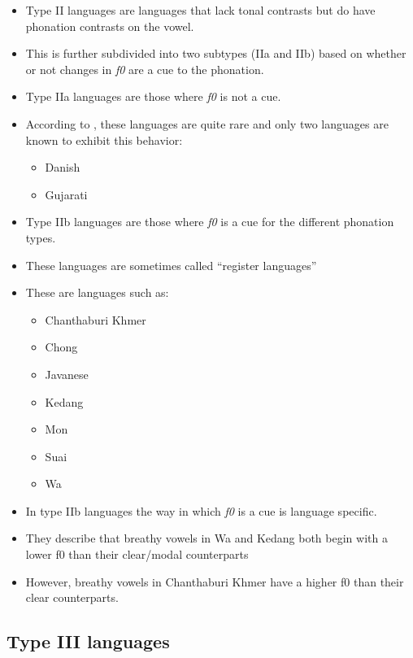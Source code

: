\begin{itemize}
    \item Type II languages are languages that lack tonal contrasts but do have phonation contrasts on the vowel. 
    \item This is further subdivided into two subtypes (IIa and IIb) based on whether or not changes in \textit{f0} are a cue to the phonation. 
    \item Type IIa languages are those where \textit{f0} is not a cue. 
    \item According to \citet{espositoCrosslinguisticPatternsPhonation2020}, these languages are quite rare and only two languages are known to exhibit this behavior: 
    \begin{itemize}
        \item Danish \citep{gronnumDanishStodLaryngealization2013}
        \item Gujarati \citep{khanPhoneticsContrastivePhonation2012}
    \end{itemize} 
    \item Type IIb languages are those where \textit{f0} is a cue for the different phonation types.
    \item These languages are sometimes called ``register languages''
    \item These are languages such as: 
    \begin{itemize}
        \item Chanthaburi Khmer
        \item Chong 
        \item Javanese
        \item Kedang
        \item Mon
        \item Suai 
        \item Wa
    \end{itemize}
    \item In type IIb languages the way in which \textit{f0} is a cue is language specific. 
    \item They describe that breathy vowels in Wa and Kedang both begin with a lower f0 than their clear/modal counterparts
    \item However, breathy vowels in Chanthaburi Khmer have a higher f0 than their clear counterparts.
\end{itemize}

\subsection{Type III languages} \label{sec:TypeIII}

